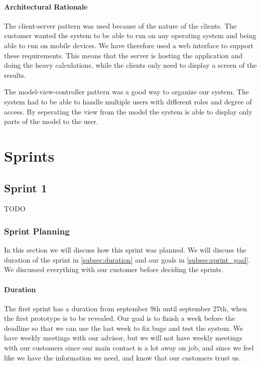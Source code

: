 \documentclass{report}
\begin{document}
\subsection{Architectural Rationale}
The client-server pattern was used because of the nature of the clients. The customer wanted the system to be able to run on any operating system and being able to run on mobile devices. We have therefore used a web interface to support these requirements. This means that the server is hosting the application and doing the heavy calculations, while the clients only need to display a screen of the results.

The model-view-controller pattern was a good way to organize our system. The system had to be able to handle multiple users with different roles and degree of access. By seperating the view from the model the system is able to display only parts of the model to the user.









\part{Sprints}

\chapter{Sprint 1} \label{cha:sprint_1}
TODO
\newpage
\section{Sprint Planning} \label{sec:sprint_planning1}
In this section we will discuss how this sprint was planned. We will discuss the duration of the sprint in \ref{subsec:duration} and our goals in \ref{subsec:sprint_goal}. We discussed everything with our customer before deciding the sprints.
\subsection{Duration} \label{subsec:duration1}
The first sprint has a duration from september 9th until september 27th, when the first prototype is to be revealed. Our goal is to finish a week before the deadline so that we can use the last week to fix bugs and test the system. We have weekly meetings with our advisor, but we will not have weekly meetings with our customers since our main contact is a lot away on job, and since we feel like we have the information we need, and know that our customers trust us.
\end{document}
